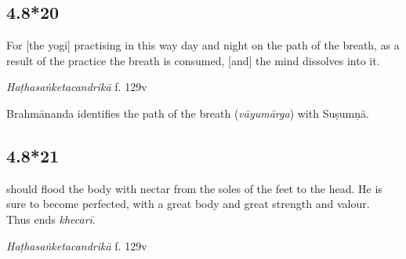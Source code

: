 \begin{ekdosis}
%

\subsection*{4.8*20}
\begin{translation}[hp04_008_20]
For [the yogi] practising in this way day and night on the path of the breath, as a result of the practice the breath is consumed, [and] the mind dissolves into it.
\end{translation}


\begin{testimonia}[hp04_008_20]
\emph{Haṭhasaṅketacandrikā} f. 129v
\begin{versinnote}
\end{versinnote}
\end{testimonia}

\begin{philcomm}[hp04_008_20]
Brahmānanda identifies the path of the breath (\emph{vāyumārga}) with Suṣumṇā.
\end{philcomm}

\subsection*{4.8*21}
\begin{translation} should flood the body with nectar from the soles of the feet to the head. He is sure to become perfected, with a great body and great strength and valour.\\Thus ends \emph{khecarī}.
\end{translation}


\begin{testimonia}[hp04_008_21]
\emph{Haṭhasaṅketacandrikā} f. 129v
\begin{versinnote}
\end{versinnote}
\end{testimonia}



\end{ekdosis}

